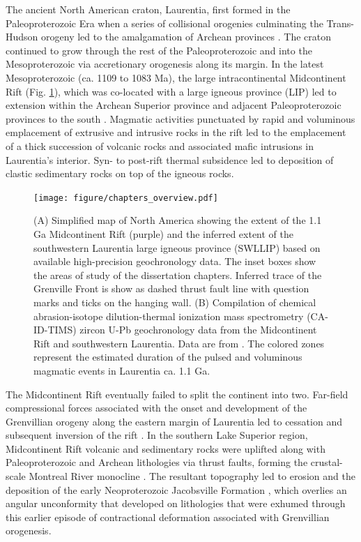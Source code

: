 The ancient North American craton, Laurentia, first formed in the Paleoproterozoic Era when a series of collisional orogenies culminating the Trans-Hudson orogeny led to the amalgamation of Archean provinces \citep{Hoffman1988a, Whitmeyer2007a}. The craton continued to grow through the rest of the Paleoproterozoic and into the Mesoproterozoic via accretionary orogenesis along its margin. In the latest Mesoproterozoic (ca. 1109 to 1083 Ma), the large intracontinental Midcontinent Rift (Fig. \ref{fig:abstract_overview}), which was co-located with a large igneous province (LIP) \citep{Swanson-Hysell2021a} led to extension within the Archean Superior province and adjacent Paleoproterozoic provinces to the south \citep{Cannon1992a}. Magmatic activities punctuated by rapid and voluminous emplacement of extrusive and intrusive rocks in the rift led to the emplacement of a thick succession of volcanic rocks and associated mafic intrusions in Laurentia’s interior. Syn- to post-rift thermal subsidence led to deposition of clastic sedimentary rocks on top of the igneous rocks.

\begin{figure}[h!]
    \centering
    \texttt{[image: figure/chapters\_overview.pdf]}
    \caption[Overview of thesis study area and geochronology data]{(A) Simplified map of North America showing the extent of the 1.1 Ga Midcontinent Rift (purple) and the inferred extent of the southwestern Laurentia large igneous province (SWLLIP) based on available high-precision geochronology data. The inset boxes show the areas of study of the dissertation chapters. Inferred trace of the Grenville Front is show as dashed thrust fault line with question marks and ticks on the hanging wall. (B) Compilation of chemical abrasion-isotope dilution-thermal ionization mass spectrometry (CA-ID-TIMS) zircon U-Pb geochronology data from the Midcontinent Rift and southwestern Laurentia. Data are from \cite{Fairchild2017a, Swanson-Hysell2014a, Swanson-Hysell2019a, Mohr2024a}. The colored zones represent the estimated duration of the pulsed and voluminous magmatic events in Laurentia ca. 1.1 Ga.}
    \label{fig:abstract_overview}
\end{figure}

The Midcontinent Rift eventually failed to split the continent into two. Far-field compressional forces associated with the onset and development of the Grenvillian orogeny along the eastern margin of Laurentia led to cessation and subsequent inversion of the rift \citep{Cannon1993a, Swanson-Hysell2019a}. In the southern Lake Superior region, Midcontinent Rift volcanic and sedimentary rocks were uplifted along with Paleoproterozoic and Archean lithologies via thrust faults, forming the crustal-scale Montreal River monocline \citep{Cannon1993a}. The resultant topography led to erosion and the deposition of the early Neoproterozoic Jacobsville Formation \citep{Hamblin1958a, Kalliokoski1982a, Hodgin2022a}, which overlies an angular unconformity that developed on lithologies that were exhumed through this earlier episode of contractional deformation associated with Grenvillian orogenesis. 


